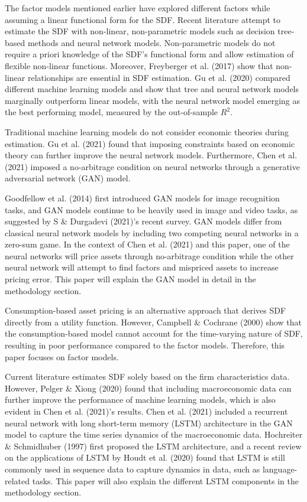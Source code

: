 \documentclass[12pt]{article}
\begin{document}
The factor models mentioned earlier have explored different
factors while assuming a linear functional form for the SDF.
Recent literature attempt to estimate the SDF
with non-linear, non-parametric models such as decision tree-based methods and
neural network models. Non-parametric models do not require
a priori knowledge of the SDF's functional form and
allow estimation of flexible non-linear functions.
Moreover, Freyberger et al. (2017) show that
non-linear relationships are essential in SDF estimation.
Gu et al. (2020) compared different
machine learning models and show that tree and neural
network models marginally outperform linear models,
with the neural network model emerging as the best performing model,
measured by the out-of-sample \(R^2\).

Traditional machine learning models do not
consider economic theories during estimation.
Gu et al. (2021) found that imposing
constraints based on economic theory can further improve
the neural network models.
Furthermore, Chen et al. (2021) imposed a no-arbitrage condition on neural
networks through a generative adversarial network (GAN)
model.

Goodfellow et al. (2014) first introduced GAN models for image recognition tasks,
and GAN models continue to be heavily used in image and video tasks,
as suggested by S \& Durgadevi (2021)'s recent survey.
GAN models differ from classical neural network models by including two
competing neural networks in a zero-sum game. In the context
of Chen et al. (2021) and this paper, one of the neural
networks will price assets through no-arbitrage condition while the
other neural network will attempt to find factors and
mispriced assets to increase pricing error.
This paper will explain the GAN model in detail in the methodology section.

Consumption-based asset pricing is an alternative approach
that derives SDF directly from a utility function. However,
Campbell \& Cochrane (2000) show that the consumption-based model
cannot account for the time-varying
nature of SDF, resulting in poor performance compared to
the factor models. Therefore, this paper focuses on
factor models.

Current literature estimates SDF solely based on the
firm characteristics data. However,
Pelger \& Xiong (2020) found that
including macroeconomic data can further improve the
performance of machine learning models, which is also
evident in Chen et al. (2021)'s results.
Chen et al. (2021) included a recurrent neural network with
long short-term memory (LSTM) architecture in the GAN model
to capture the time series dynamics of the macroeconomic data.
Hochreiter \& Schmidhuber (1997) first proposed the LSTM architecture, and a recent
review on the applications of LSTM by Houdt et al. (2020)
found that LSTM is still commonly used in sequence data to
capture dynamics in data, such as language-related tasks.
This paper will also explain the different LSTM components
in the methodology section.
\end{document}
